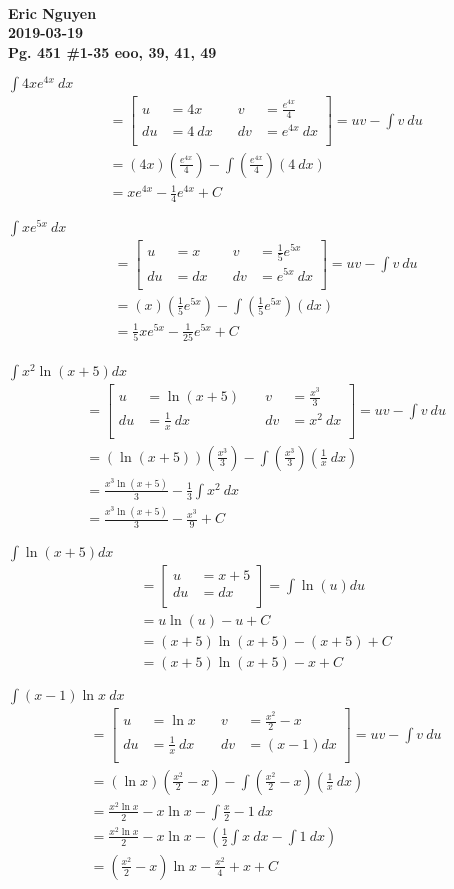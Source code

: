 \documentclass[12pt]{article}
\newenvironment{problem}[2][]{
    \begin{trivlist}
        \item[
            {\bfseries #1}
            {\bfseries #2.}
        ]
}{\end{trivlist}}
\newcommand{\assignment}{Pg. 451 \#1-35 eoo, 39, 41, 49}
\newcommand{\name}{Eric Nguyen}
\newcommand{\duedate}{2019-03-19}
\newcommand{\details}{\textbf{\\\name \\\duedate \\\assignment}}
\newcommand{\setuv}[4]{
\left[
\begin{alignedat}{2}
u &= #1 &\quad v &= #2 \\
du &= #3 &\quad dv &= #4 \\
\end{alignedat}
\right]  = uv - \int v ~ du \\
&= \intbp{#1}{#2}{#3}
}
\newcommand{\subu}[2]{
\left[
\begin{alignedat}{1}
u &= #1 \\
du &= #2 \\
\end{alignedat}
\right] 
}
\newcommand{\intbp}[3]{\left(#1\right) \left(#2\right) - \int \left(#2\right) \left(#3\right)}
\begin{document}
\details

\begin{problem}{1}
$\displaystyle\int 4xe^{4x} ~ dx$
\begin{align}
&= \setuv{4x}{\frac{e^{4x}}{4}}{4 ~ dx}{e^{4x} ~ dx} \\
&= xe^{4x} - \frac{1}{4}e^{4x} + C
\end{align}
\end{problem}

\begin{problem}{5}
$\displaystyle\int xe^{5x} ~ dx$
\begin{align}
&= \setuv{x}{\frac{1}{5} e^{5x}}{dx}{e^{5x} ~ dx} \\
&= \frac{1}{5} xe^{5x} - \frac{1}{25} e^{5x} + C \\
\end{align}
\end{problem}

\begin{problem}{9}
$\displaystyle\int x^2 \ln \left(x + 5\right) dx$
\begin{align}
&= \setuv{\ln \left(x + 5\right)}{\frac{x^3}{3}}{\frac{1}{x} ~ dx}{x^2 ~ dx} \\
&= \frac{x^3 \ln \left(x + 5\right)}{3} - \frac{1}{3} \int x^2 ~ dx \\
&= \frac{x^3 \ln \left(x + 5\right)}{3} - \frac{x^3}{9} + C
\end{align}
\end{problem}

\begin{problem}{13}
$\displaystyle\int \ln\left(x + 5\right) dx$
\begin{align}
&= \subu{x + 5}{dx} = \int \ln \left(u\right) du \\
&= u \ln \left(u\right) - u + C \\
&= \left(x + 5\right) \ln \left(x + 5\right) - \left(x + 5\right) + C \\
&= \left(x + 5\right) \ln \left(x + 5\right) - x + C
\end{align}
\end{problem}

\begin{problem}{17}
$\displaystyle\int \left(x - 1\right) \ln x ~ dx$
\begin{align}
&= \setuv{\ln x}{\frac{x^2}{2} - x}{\frac{1}{x} ~ dx}{\left(x - 1\right) dx} \\
&= \frac{x^2 \ln x}{2} - x \ln x - \int \frac{x}{2} - 1 ~ dx \\
&= \frac{x^2 \ln x}{2} - x \ln x - \left(\frac{1}{2} \int x ~ dx - \int 1 ~ dx\right) \\
&= \left(\frac{x^2}{2} - x\right) \ln x - \frac{x^2}{4} + x + C \\
\end{align}
\end{problem}
\end{document}
